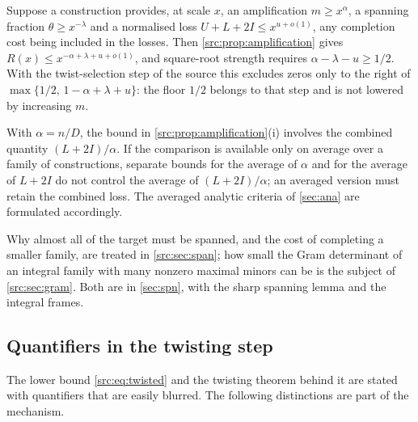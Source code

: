 \begin{remark}[Rates]\label{src:rem:rates}
Suppose a construction provides, at scale $x$, an amplification $m\ge x^{\alpha}$, a spanning
fraction $\theta\ge x^{-\lambda}$ and a normalised loss $U+L+2I\le x^{u+o(1)}$, any completion
cost being included in the losses. Then \cref{src:prop:amplification} gives
$R(x)\le x^{-\alpha+\lambda+u+o(1)}$, and square-root strength requires
$\alpha-\lambda-u\ge1/2$. With the twist-selection step of the source this excludes zeros
only to the right of $\max\{1/2,\,1-\alpha+\lambda+u\}$: the floor $1/2$ belongs to that step
and is not lowered by increasing $m$.
\end{remark}

\begin{remark}[Averaging]\label{src:rem:averaging}
With $\alpha=n/D$, the bound in \cref{src:prop:amplification}(i) involves the combined
quantity $(L+2I)/\alpha$. If the comparison is available only on average over a family of
constructions, separate bounds for the average of $\alpha$ and for the average of $L+2I$ do
not control the average of $(L+2I)/\alpha$; an averaged version must retain the combined loss.
The averaged analytic criteria of \cref{sec:ana} are formulated accordingly.
\end{remark}

Why almost all of the target must be spanned, and the cost of completing a smaller family, are
treated in \cref{src:sec:span}; how small the Gram determinant of an integral family with many
nonzero maximal minors can be is the subject of \cref{src:sec:gram}. Both are in
\cref{sec:spn}, with the sharp spanning lemma and the integral frames.

\subsection{Quantifiers in the twisting step}\label{src:sec:quantifiers}
\begingroup\raggedright
{}
\endgroup

The lower bound \eqref{src:eq:twisted} and the twisting theorem behind it are stated with
quantifiers that are easily blurred. The following distinctions are part of the mechanism.

